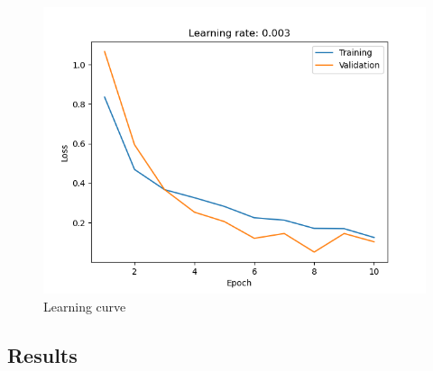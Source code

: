     \begin{figure}[htbp]
        \centering
        \includegraphics[width=\linewidth]{../plots/orientation/2024-01-20 21:01:42-train-val-plot.png}
        \caption{Learning curve}
        \label{fig:learning-curve}
    \end{figure}

\subsection{Results}

